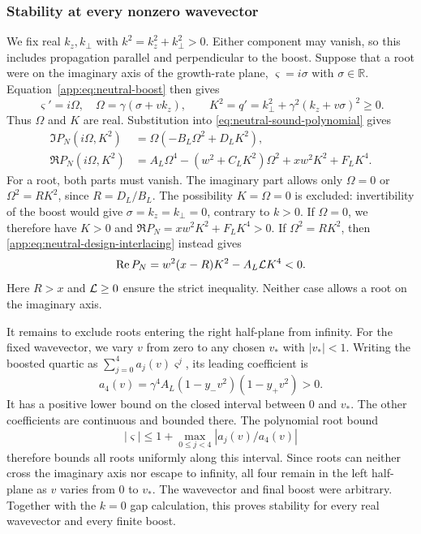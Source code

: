 \subsubsection*{Stability at every nonzero wavevector}
We fix real $k_z,k_\perp$ with $k^2=k_z^2+k_\perp^2>0$.
Either component may vanish, so this includes propagation parallel and
perpendicular to the boost. Suppose that a root were on the imaginary
axis of the growth-rate plane, $\varsigma=i\sigma$ with
$\sigma\in\mathbb R$. Equation~\eqref{app:eq:neutral-boost} then gives
\begin{equation}\label{app:eq:boost-imaginary-root}
 \varsigma'=i\Omega,\quad \Omega=\gamma(\sigma+vk_z),\qquad
 K^2=q'=k_\perp^2+\gamma^2(k_z+v\sigma)^2\geq0.
\end{equation}
Thus $\Omega$ and $K$ are real. Substitution into
\eqref{eq:neutral-sound-polynomial} gives
\begin{align}
 \Im P_N(i\Omega,K^2)&=\Omega(-B_L\Omega^2+D_LK^2),\\
 \Re P_N(i\Omega,K^2)&=A_L\Omega^4-(w^2+C_LK^2)\Omega^2
                     +xw^2K^2+F_LK^4.
\end{align}
For a root, both parts must vanish. The imaginary part allows only
$\Omega=0$ or $\Omega^2=RK^2$, since $R=D_L/B_L$.
The possibility $K=\Omega=0$ is excluded: invertibility of the boost
would give $\sigma=k_z=k_\perp=0$, contrary to $k>0$.
If $\Omega=0$, we therefore have $K>0$ and
$\Re P_N=xw^2K^2+F_LK^4>0$. If $\Omega^2=RK^2$, then
\eqref{app:eq:neutral-design-interlacing} instead gives
\begin{equation}\label{app:eq:neutral-axis-exclusion}
 \operatorname{Re} P_N=w^2(x-R)K^2-A_L\mathcal L K^4<0.
\end{equation}
Here $R>x$ and $\mathcal L\geq0$ ensure the strict inequality. Neither case
allows a root on the imaginary axis.

It remains to exclude roots entering the right half-plane from infinity.
For the fixed wavevector, we vary $v$ from zero to any chosen
$v_*$ with $|v_*|<1$. Writing the boosted quartic as
$\sum_{j=0}^4a_j(v)\varsigma^j$, its leading coefficient is
\[
 a_4(v)=\gamma^4A_L(1-y_-v^2)(1-y_+v^2)>0.
\]
It has a positive lower bound on the closed interval between $0$ and
$v_*$. The other coefficients are continuous and bounded there.
The polynomial root bound
\begin{equation}\label{app:eq:boost-root-bound}
 |\varsigma|\leq1+\max_{0\leq j<4}|a_j(v)/a_4(v)|
\end{equation}
therefore bounds all roots uniformly along this interval. Since roots
can neither cross the imaginary axis nor escape to infinity, all four
remain in the left half-plane as $v$ varies from $0$ to $v_*$. The
wavevector and final boost were arbitrary. Together with the $k=0$
gap calculation, this proves stability for every real wavevector and
every finite boost.


